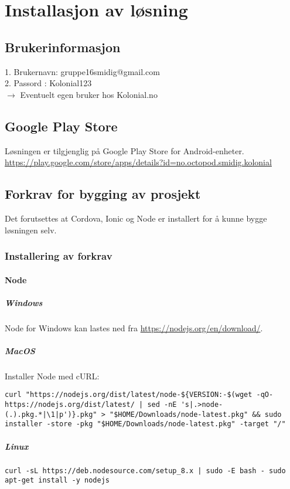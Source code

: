 \section{\textbf{Installasjon av løsning}}
\subsection{\textbf{Brukerinformasjon}}
1. Brukernavn: gruppe16smidig@gmail.com\\
2. Passord   : Kolonial123\\
$\rightarrow$ Eventuelt egen bruker hos Kolonial.no

\subsection{\textbf{Google Play Store}}
Løsningen er tilgjenglig på Google Play Store for Android-enheter.
\url{https://play.google.com/store/apps/details?id=no.octopod.smidig.kolonial}

\subsection{\textbf{Forkrav for bygging av prosjekt}}
Det forutsettes at Cordova, Ionic og Node er installert for å kunne bygge løsningen selv.

\subsubsection{\textbf{Installering av forkrav}}
\paragraph{\textbf{Node}}
\subparagraph{Windows}
Node for Windows kan lastes ned fra \url{https://nodejs.org/en/download/}.

\subparagraph{MacOS}
Installer Node med cURL:
\begin{verbatim}
curl "https://nodejs.org/dist/latest/node-${VERSION:-$(wget -qO- https://nodejs.org/dist/latest/ | sed -nE 's|.>node-(.).pkg.*|\1|p')}.pkg" > "$HOME/Downloads/node-latest.pkg" && sudo installer -store -pkg "$HOME/Downloads/node-latest.pkg" -target "/"
\end{verbatim}

\subparagraph{Linux}
\begin{verbatim}
curl -sL https://deb.nodesource.com/setup_8.x | sudo -E bash - sudo apt-get install -y nodejs
\end{verbatim}

